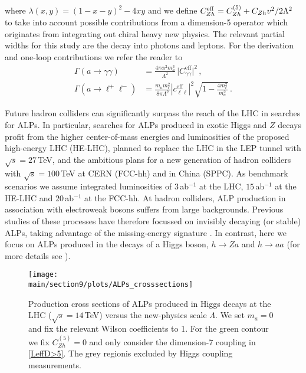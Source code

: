 %
where $\lambda(x,y)=(1-x-y)^2-4xy$ and we define $C_{Zh}^{\rm eff} = C_{Zh}^{(5)} + C_{Zh} v^2/2 \Lambda^2$ to take into account possible contributions from a dimension-5 operator which originates from integrating out chiral heavy new physics. The relevant partial widths for this study are the decay into photons and leptons. For the derivation and one-loop contributions we refer the reader to \cite{Bauer:2017ris}
%
\begin{align}
 \Gamma(a\to\gamma\gamma)  &= \frac{4\pi\alpha^2 m_a^3}{\Lambda^2}\,\big| C_{\gamma\gamma}^\text{eff} \big|^2 \,, \\
 \Gamma(a\to \ell^+ \ell^-)&=\frac{m_a m_\ell^2}{8\pi\Lambda^2} \left| c_{\ell\ell}^\text{eff}\right|^2 \sqrt{1-\frac{4m_\ell^2}{m_a^2}}\,.
\end{align}
%


Future hadron colliders can significantly surpass the reach of the LHC in searches for ALPs. In particular, searches for ALPs produced in exotic Higgs and $Z$ decays profit from the higher center-of-mass energies and luminosities of the proposed high-energy LHC (HE-LHC), planned to replace the LHC in the LEP tunnel with $\sqrt{s}=27 \,$TeV, and the ambitious plans for a new generation of hadron colliders with $\sqrt{s}=100\,$TeV at CERN (FCC-hh) and in China (SPPC). As benchmark scenarios we assume integrated luminosities of $3$\,ab$^{-1}$ at the LHC, $15$\,ab$^{-1}$ at the HE-LHC and $20$\,ab$^{-1}$ at the FCC-hh.
At hadron colliders, ALP production in association with electroweak bosons suffers from large backgrounds. Previous studies of these processes have therefore focussed on invisibly decaying (or stable) ALPs, taking advantage of the missing-energy signature \cite{Mimasu:2014nea,Brivio:2017ije}. In contrast, here we focus on ALPs produced in the decays of a Higgs boson, $h\to Za$ and $h \to a a$ (for more details see \cite{Bauer:2018uxu}).


%
\begin{figure}
\texttt{[image: \\main/section9/plots/ALPs\_crosssections]}\caption{\label{fig:ALPpsec} Production cross sections of ALPs produced in Higgs decays at the LHC ($\sqrt{s} = 14\,$TeV) versus the new-physics scale $\Lambda$. We set $m_a=0$ and fix the relevant Wilson coefficients to 1. For the green contour we fix $C_{Zh}^{(5)}=0$ and only consider the dimension-7 coupling in \eqref{LeffD>5}.
The grey regionis excluded by Higgs coupling measurements. }
\end{figure}
%

